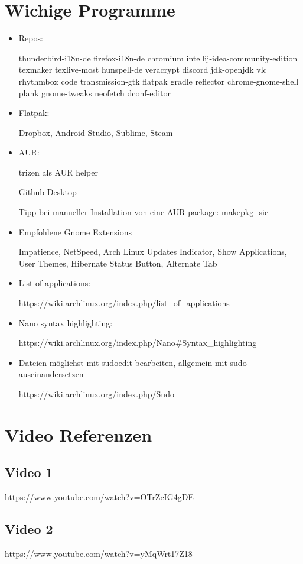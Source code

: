 \documentclass[11pt,a4paper]{article}
\begin{document}
\section{Wichige Programme}
\begin{itemize}
\item Repos:

thunderbird-i18n-de firefox-i18n-de chromium intellij-idea-community-edition texmaker texlive-most hunspell-de veracrypt discord jdk-openjdk vlc rhythmbox code transmission-gtk flatpak gradle reflector chrome-gnome-shell plank gnome-tweaks neofetch dconf-editor
\item Flatpak:

Dropbox, Android Studio, Sublime, Steam
\item AUR:

\glqq{}trizen\grqq{} als AUR helper

Github-Desktop

Tipp bei manueller Installation von eine AUR package: makepkg -sic

\item Empfohlene Gnome Extensions

Impatience, NetSpeed, Arch Linux Updates Indicator, Show Applications, User Themes, Hibernate Status Button, Alternate Tab

\item List of applications:

https://wiki.archlinux.org/index.php/list\_of\_applications

\item Nano syntax highlighting:

https://wiki.archlinux.org/index.php/Nano\#Syntax\_highlighting

\item Dateien möglichst mit \glqq sudoedit\grqq{} bearbeiten, allgemein mit sudo auseinandersetzen

https://wiki.archlinux.org/index.php/Sudo

\end{itemize}

\section{Video Referenzen}
\subsection{Video 1}
https://www.youtube.com/watch?v=OTrZcIG4gDE
\subsection{Video 2}
https://www.youtube.com/watch?v=yMqWrt17Z18
\end{document}
